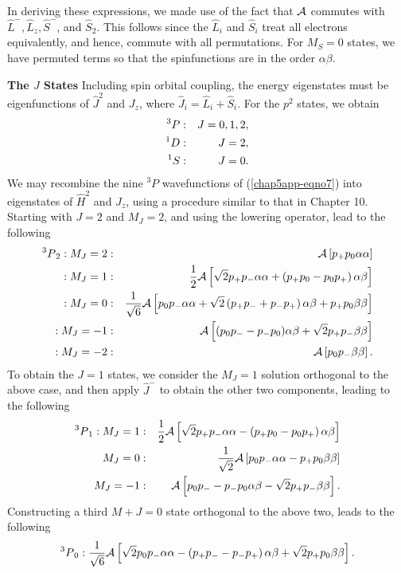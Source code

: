 In deriving these expressions, we made use of the fact that ${\cal 
A}$ commutes with ${\hat L}^- , {\hat L}_z , {\hat S}^-$, and ${\hat 
S}_2$.  This follows since the ${\hat L}_i$ and ${\hat S}_i$ treat 
all electrons equivalently, and hence, commute with all 
permutations.  For $M_S = 0$ states, we have permuted terms so that the 
spinfunctions are in the order $\alpha \beta$.

{\bf The $J$ States}
Including spin orbital coupling, the energy eigenstates must be 
eigenfunctions of ${\hat J}^2$ and $J_z$, where ${\hat J}_i = {\hat 
L}_i + {\hat S}_i$.  For the $p^2$ states, we obtain
\begin{eqnarray}
{^3P} &:& J = 0 , 1 , 2 ,\cr
{^1D} &:& J = 2,\cr
{^1S} &:& J = 0.
\end{eqnarray}
We may recombine the nine ${^3P}$ wavefunctions of (\ref{chap5app-eqno7}) into 
eigenstates of ${\hat H}^2$ and $J_z$, using a procedure similar to 
that in Chapter 10.  Starting with $J = 2$ and $M_J = 2$, and using 
the lowering operator, lead to the following
\begin{eqnarray}
{^3P}_2 : M_J = 2 &:& {\cal A} \left[ p_+ p_0 \alpha \alpha \right]\cr
: M_J = 1 &:& {1 \over 2} {\cal A} \left[ \sqrt{2} p_+ p_- \alpha 
\alpha + \left( p_+ p_0 - p_0 p_+ \right) \alpha \beta \right]\cr
: M_J = 0 &:& {1 \over \sqrt{6}} {\cal A} \left[ p_0 p_- \alpha 
\alpha + \sqrt{2} \left( p_+ p_- + p_- p_+ \right) \alpha \beta + p_+ 
p_0 \beta \beta \right]\cr
: M_J = - 1 &:& {\cal A} \left[ (p_0 p_- - p_-p_0)\alpha\beta
+\sqrt{2}p_+p_-\beta\beta\right]\cr
: M_J = - 2 &:& {\cal A} \left[ p_0 p_-\beta\beta \right] .
\end{eqnarray}
To obtain the $J = 1$ states, we consider the $M_J = 1$ solution 
orthogonal to the above case, and then apply ${\hat J}^-$ to obtain 
the other two components, leading to the following
\begin{eqnarray}
{^3P}_1 : M_J = 1 &:& {1 \over 2} {\cal A} \left[ \sqrt{2} p_+p_- 
\alpha \alpha - \left( p_+ p_0 - p_0 p_+ \right) \alpha \beta 
\right]\cr
M_J = 0 &:& {1 \over \sqrt{2}} {\cal A} \left[ p_0 p_- \alpha 
\alpha - p_+ p_0 \beta \beta \right]\cr
M_J = - 1 &:& {\cal A} \left[ p_0 p_- - p_- p_0 \alpha \beta - \sqrt{2} 
p_+ p_- \beta \beta \right] .
\end{eqnarray}
Constructing a third $M + J = 0$ state orthogonal to the above two, 
leads to the following
\begin{equation}
{^3P}_0 : {1 \over \sqrt{6}} {\cal A} \left[ \sqrt{2} p_0 p_- \alpha 
\alpha - \left( p_+ p_- - p_- p_+ \right) \alpha \beta + \sqrt{2} p_+ 
p_0 \beta \beta \right] .
\end{equation}

